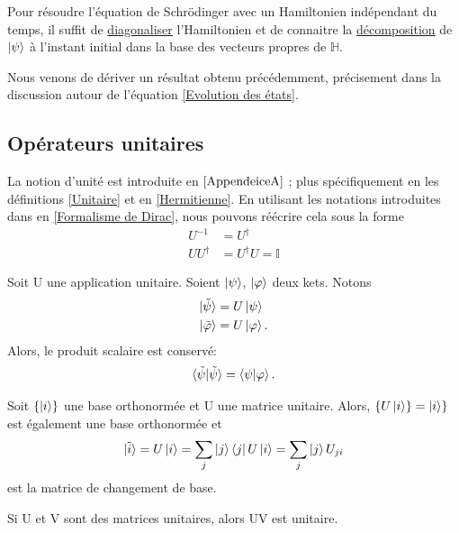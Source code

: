 \documentclass[../notesdecours.tex]{subfiles}
\begin{document}
Pour résoudre l'équation de Schrödinger avec un Hamiltonien indépendant du temps, il suffit de \underline{diagonaliser} l'Hamiltonien et de connaitre la \underline{décomposition} de $\ket{\psi}$ à l'instant initial dans la base des vecteurs propres de $\mathbb{H}$.\\

\begin{remark}
	Nous venons de dériver un résultat obtenu précédemment, précisement dans la discussion autour de l'équation \eqref{Evolution des états}.
\end{remark}

\subsection{Opérateurs unitaires}
La notion d'unité est introduite en $\ref{AppendeiceA}$ ; plus spécifiquement en les définitions \ref{Unitaire} et en \ref{Hermitienne}. En utilisant les notations introduites dans en \ref{Formalisme de Dirac}, nous pouvons réécrire cela sous la forme
\begin{align}
U^{-1} &= U^\dag\\
UU^\dag &= U^\dag U = \mathbb{I}
\end{align}
\begin{Property} Soit U une application unitaire. Soient $\ket{\psi}$, $\ket{\varphi}$ deux kets. Notons
\begin{align*}
\ket{\tilde{\psi}} &= U\ket{\psi}\\
\ket{\tilde{\varphi}} &= U\ket{\varphi}.
\end{align*}
Alors, le produit scalaire est conservé:
\begin{equation}
\braket{\tilde{\psi}|\tilde{\psi}} = \braket{\psi|\varphi}.
\end{equation}
\end{Property}

\begin{Property} 
Soit $\{\ket{i}\}$ une base orthonormée et U une matrice unitaire. Alors, $\{U\ket{i}\} = \ket{i}\}$ est également une base orthonormée et 
\begin{equation}
\ket{\tilde{i}} = U\ket{i} = \sum_j \ket{j}\bra{j}U\ket{i} = \sum_j \ket{j}U_{ji}
\end{equation}
est la matrice de changement de base.
\end{Property}

\begin{Property}
Si U et V sont des matrices unitaires, alors UV est unitaire. \end{Property}
\end{document}

